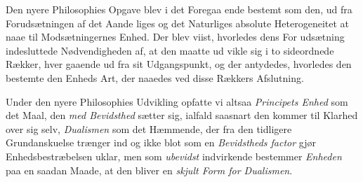 Den nyere Philosophies Opgave blev i det Foregaa\-%
ende bestemt som den, ud fra Forudsætningen af det Aande\-%
liges og det Naturliges absolute Heterogeneitet at naae til
Modsætningernes Enhed. Der blev viist, hvorledes dens For\-%
udsætning indesluttede Nødvendigheden af, at den maatte ud\-%
vikle sig i to sideordnede Rækker, hver gaaende ud fra sit
Udgangspunkt, og der antydedes, hvorledes den bestemte den
Enheds Art, der naaedes ved disse Rækkers Afslutning.

Under den nyere Philosophies Udvikling opfatte vi altsaa
\emph{Principets Enhed} som det Maal, den \emph{med Bevidsthed}
sætter sig, ialfald saasnart den kommer til Klarhed over sig
selv, \emph{Dualismen} som det Hæmmende, der fra den tidligere
Grundanskuelse trænger ind og ikke blot som en \emph{Bevidstheds\-%
factor} gjør Enhedsbestræbelsen uklar, men som \emph{ubevidst}
indvirkende bestemmer \emph{Enheden} paa en saadan Maade, at
den bliver en \emph{skjult Form for Dualismen}.

